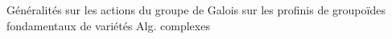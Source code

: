 Généralités sur les actions du groupe de Galois sur les  profinis de groupoïdes fondamentaux de variétés Alg. complexes
